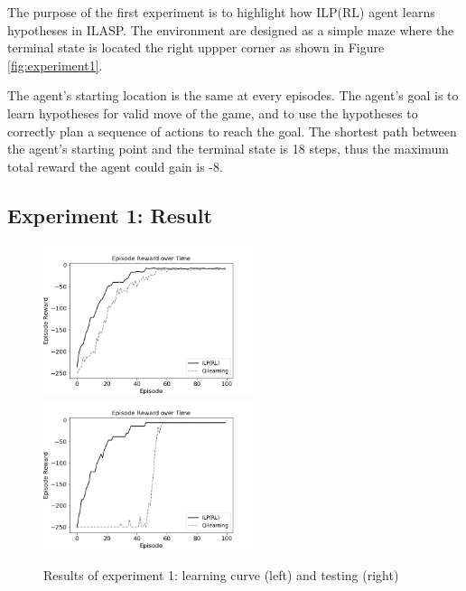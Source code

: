 The purpose of the first experiment is to highlight how ILP(RL) agent learns hypotheses in ILASP.
The environment are designed as a simple maze where the terminal state is located the right uppper corner as shown in Figure \ref{fig:experiment1}.

The agent's starting location is the same at every episodes. The agent's goal is to learn hypotheses for valid move of the game, and to use the hypotheses to correctly plan a sequence of actions to reach the goal.
The shortest path between the agent's starting point and the terminal state is 18 steps, thus the maximum total reward the agent could gain is -8.
    
\subsection{Experiment 1: Result}
\label{subsec:experiment1_result}

\begin{figure}[!htb]
\centerline{
\includegraphics[width=0.55\textwidth]{./figures/experiment1_training}
\includegraphics[width=0.55\textwidth]{./figures/experiment1_test}
}
\caption{Results of experiment 1: learning curve (left) and testing (right)}
\label{experiment1_result}
\end{figure}

